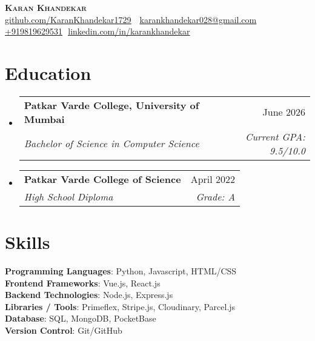 \documentclass[letterpaper,11pt]{article}
\makeatletter
\newcommand{\resumeSubheading}[4]{
  \vspace{-2pt}\item
    \begin{tabular*}{0.97\textwidth}[t]{l@{\extracolsep{\fill}}r}
      \textbf{#1} & #2 \\
      \textit{\small#3} & \textit{\small #4} \\
    \end{tabular*}\vspace{-7pt}
}
\newcommand{\resumeSubHeadingListStart}{\begin{itemize}[leftmargin=0.15in, label={}]}
\newcommand{\resumeSubHeadingListEnd}{\end{itemize}}
\makeatother
\begin{document}
\begin{flushright}
  \vspace{-4pt}
\end{flushright}

\vspace{-7pt}

\begin{center}
    \textbf{\Huge \scshape Karan Khandekar} \\ \vspace{8pt}
    \small 
    \faGithub
    \href{github.com/KaranKhandekar1729}{\underline{github.com/KaranKhandekar1729}} $  $
    \faEnvelope$  $
    \href{mailto:karankhandekar028@gmail.com}
    {\underline{karankhandekar028@gmail.com}}
    \faPhone$  $
    \underline{+919819629531}
    \faLinkedin$  $
    \href{linkedin.com/in/karankhandekar}{\underline{linkedin.com/in/karankhandekar}} $  $
\end{center}

\section{Education}
  \resumeSubHeadingListStart
    \resumeSubheading
        {Patkar Varde College, University of Mumbai}{June 2026}
        {Bachelor of Science in Computer Science}{Current GPA: 9.5/10.0}
  
    \resumeSubheading
      {Patkar Varde College of Science}{April 2022}
      {High School Diploma}{Grade: A}
      

  \resumeSubHeadingListEnd

\section{Skills}
\begin{itemize}[leftmargin=0.15in, label={}]
\small{\item{
    \textbf{Programming Languages}{: Python, Javascript, HTML/CSS} \\
    
    \textbf{Frontend Frameworks}{: Vue.js, React.js} \\
    
    \textbf{Backend Technologies}{: Node.js, Express.js} \\
    
    \textbf{Libraries / Tools}{: Primeflex, Stripe.js, Cloudinary, Parcel.js} \\
    
    \textbf{Database}{: SQL, MongoDB, PocketBase} \\
    
    \textbf{Version Control}{: Git/GitHub} \\
}}
\end{itemize}
\end{document}
